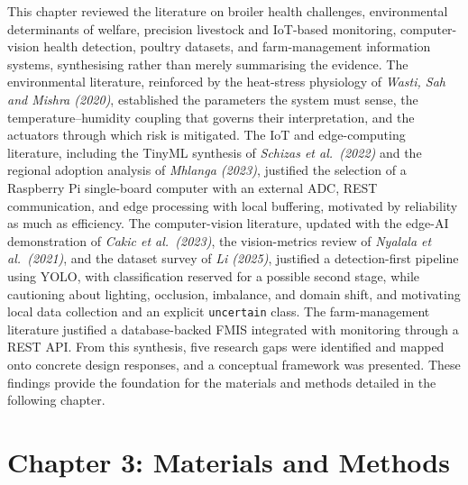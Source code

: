 \documentclass[12pt,a4paper]{report}
\begin{document}
This chapter reviewed the literature on broiler health challenges, environmental determinants of welfare, precision livestock and IoT-based monitoring, computer-vision health detection, poultry datasets, and farm-management information systems, synthesising rather than merely summarising the evidence. The environmental literature, reinforced by the heat-stress physiology of \textit{Wasti, Sah and Mishra (2020)}, established the parameters the system must sense, the temperature--humidity coupling that governs their interpretation, and the actuators through which risk is mitigated. The IoT and edge-computing literature, including the TinyML synthesis of \textit{Schizas et al.\ (2022)} and the regional adoption analysis of \textit{Mhlanga (2023)}, justified the selection of a Raspberry Pi single-board computer with an external ADC, REST communication, and edge processing with local buffering, motivated by reliability as much as efficiency. The computer-vision literature, updated with the edge-AI demonstration of \textit{Cakic et al.\ (2023)}, the vision-metrics review of \textit{Nyalala et al.\ (2021)}, and the dataset survey of \textit{Li (2025)}, justified a detection-first pipeline using YOLO, with classification reserved for a possible second stage, while cautioning about lighting, occlusion, imbalance, and domain shift, and motivating local data collection and an explicit \texttt{uncertain} class. The farm-management literature justified a database-backed FMIS integrated with monitoring through a REST API. From this synthesis, five research gaps were identified and mapped onto concrete design responses, and a conceptual framework was presented. These findings provide the foundation for the materials and methods detailed in the following chapter.

\chapter{Chapter 3: Materials and Methods}
\setcounter{section}{0}
\renewcommand{\thesection}{3.\arabic{section}}
\renewcommand{\thesubsection}{3.\arabic{section}.\arabic{subsection}}
\end{document}
